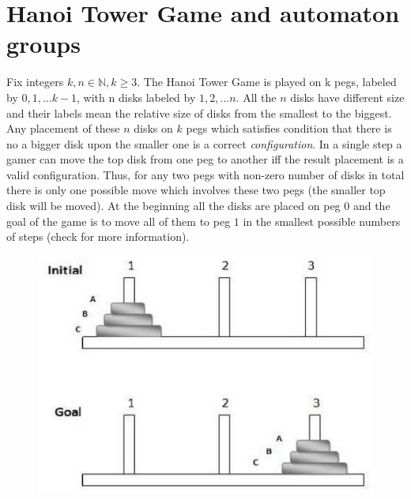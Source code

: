\documentclass[a4paper,12pt]{amsart}
\begin{document}
\section{Hanoi Tower Game and automaton groups}
 
Fix integers $k, n \in \mathbb{N}, k \ge 3$. The Hanoi Tower Game is played on k pegs, labeled by
$0, 1, ... k-1$, with n disks labeled by $1, 2, ... n$. All the $n$ disks have different
size and their labels mean the relative size of disks from the smallest to the biggest. 
Any placement of these $n$ disks on $k$ pegs which satisfies condition that there is no 
a bigger disk upon the smaller one is a correct \textit{configuration}. In a single step 
a gamer can move the top disk from one peg to another iff the result placement is a valid configuration. 
Thus, for any two pegs with non-zero number of disks in total there is only one possible move which 
involves these two pegs (the smaller top disk will be moved). At the beginning all the disks are placed 
on peg $0$ and the goal of the game is to move all of them to peg $1$ in the smallest possible numbers of 
steps (check \cite{HaoniDesk} for more information).

\begin{figure}[h]
	\includegraphics[scale=0.4]{../graphs/hanoi_tower.jpg}
	\centering
\end{figure}
\end{document}
